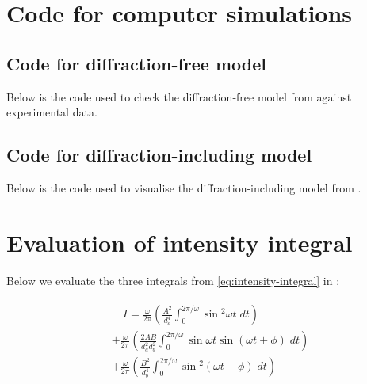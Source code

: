 \documentclass{paper}
\begin{document}
\pagebreak

\printbibliography[heading=bibintoc]

\pagebreak

\begin{appendices}

\section{Code for computer simulations}
\subsection{Code for diffraction-free model}
\label{appendix:diffraction-free-code}
\renewcommand*{\thepage}{A\arabic{page}}
\renewcommand{\theequation}{A.\arabic{equation}}
\setcounter{equation}{0}
Below is the code used to check the diffraction-free model from  against experimental data.


\subsection{Code for diffraction-including model}
\label{appendix:diffraction-code}
Below is the code used to visualise the diffraction-including model from .



\section{Evaluation of intensity integral}

\label{appendix:intensity-integral}
\setcounter{equation}{0}
\renewcommand*{\thepage}{B\arabic{page}}
\renewcommand{\theequation}{B.\arabic{equation}}


Below we evaluate the three integrals from \eqref{eq:intensity-integral} in :

\begin{align}
    \begin{aligned}
    \label{eq:the-three-integrals}
        &\quad{}I =\frac{\omega}{2\pi}\left(\frac{A^{2}}{d_{a}^{4}}\int_{0}^{2\pi/\omega}\sin{}^    {2}\omega{}t \; dt \right)  \\
        &+ \frac{\omega}{2\pi}\left(\frac{2AB}{d_{a}^{2}d_{b}^{2}}\int_{0}^{2\pi/\omega}\sin{\omega{}t}    \sin(\omega{}t + \phi) \; dt \right) \\
        &+ \frac{\omega}{2\pi}\left(\frac{B^{2}}{d_{b}^{4}}\int_{0}^{2\pi/\omega}\sin{}^{2}(\omega{}t +     \phi) \; dt \right) \\
    \end{aligned}
\end{align}
            

\end{appendices}
\end{document}

